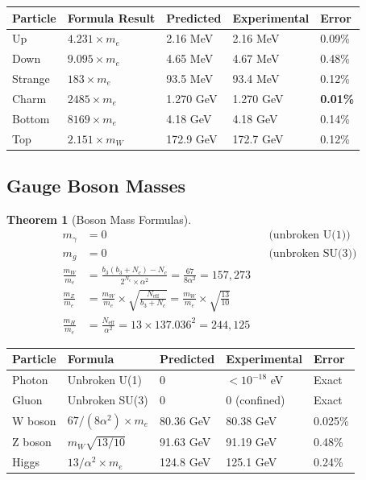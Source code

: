 \documentclass[11pt,a4paper]{article}
\newtheorem{theorem}{Theorem}[section]
\theoremstyle{definition}
\theoremstyle{remark}
\newcommand{\Neff}{N_{\text{eff}}}
\begin{document}
\begin{center}
\begin{tabular}{lllll}
\toprule
Particle & Formula Result & Predicted & Experimental & Error \\
\midrule
Up & $4.231 \times m_e$ & 2.16 MeV & 2.16 MeV & 0.09\% \\
Down & $9.095 \times m_e$ & 4.65 MeV & 4.67 MeV & 0.48\% \\
Strange & $183 \times m_e$ & 93.5 MeV & 93.4 MeV & 0.12\% \\
Charm & $2485 \times m_e$ & 1.270 GeV & 1.270 GeV & \textbf{0.01\%} \\
Bottom & $8169 \times m_e$ & 4.18 GeV & 4.18 GeV & 0.14\% \\
Top & $2.151 \times m_W$ & 172.9 GeV & 172.7 GeV & 0.12\% \\
\bottomrule
\end{tabular}
\end{center}

\subsection{Gauge Boson Masses}

\begin{theorem}[Boson Mass Formulas]
\begin{align}
m_\gamma &= 0 && \text{(unbroken U(1))} \\
m_g &= 0 && \text{(unbroken SU(3))} \\
\frac{m_W}{m_e} &= \frac{b_3(b_3 + N_c) - N_c}{2^{N_c} \times \alpha^2} = \frac{67}{8\alpha^2} = 157{,}273 \\
\frac{m_Z}{m_e} &= \frac{m_W}{m_e} \times \sqrt{\frac{\Neff}{b_3 + N_c}} = \frac{m_W}{m_e} \times \sqrt{\frac{13}{10}} \\
\frac{m_H}{m_e} &= \frac{\Neff}{\alpha^2} = 13 \times 137.036^2 = 244{,}125
\end{align}
\end{theorem}

\begin{center}
\begin{tabular}{lllll}
\toprule
Particle & Formula & Predicted & Experimental & Error \\
\midrule
Photon & Unbroken U(1) & 0 & $<10^{-18}$ eV & Exact \\
Gluon & Unbroken SU(3) & 0 & 0 (confined) & Exact \\
W boson & $67/(8\alpha^2) \times m_e$ & 80.36 GeV & 80.38 GeV & 0.025\% \\
Z boson & $m_W \sqrt{13/10}$ & 91.63 GeV & 91.19 GeV & 0.48\% \\
Higgs & $13/\alpha^2 \times m_e$ & 124.8 GeV & 125.1 GeV & 0.24\% \\
\bottomrule
\end{tabular}
\end{center}
\end{document}
